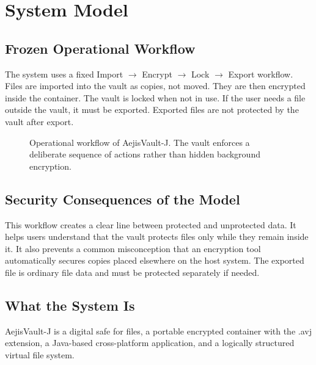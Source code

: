 \documentclass[12pt,a4paper]{report}
\newcommand{\projname}{AejisVault-J}
\begin{document}
\chapter{System Model}
\section{Frozen Operational Workflow}
The system uses a fixed Import $\rightarrow$ Encrypt $\rightarrow$ Lock $\rightarrow$ Export workflow. Files are imported into the vault as copies, not moved. They are then encrypted inside the container. The vault is locked when not in use. If the user needs a file outside the vault, it must be exported. Exported files are not protected by the vault after export.

\begin{figure}[H]
\centering
{}
\caption{Operational workflow of \projname{}. The vault enforces a deliberate sequence of actions rather than hidden background encryption.}
\label{fig:workflow}
\end{figure}

\section{Security Consequences of the Model}
This workflow creates a clear line between protected and unprotected data. It helps users understand that the vault protects files only while they remain inside it. It also prevents a common misconception that an encryption tool automatically secures copies placed elsewhere on the host system. The exported file is ordinary file data and must be protected separately if needed.

\section{What the System Is}
\projname{} is a digital safe for files, a portable encrypted container with the .avj extension, a Java-based cross-platform application, and a logically structured virtual file system.
\end{document}
